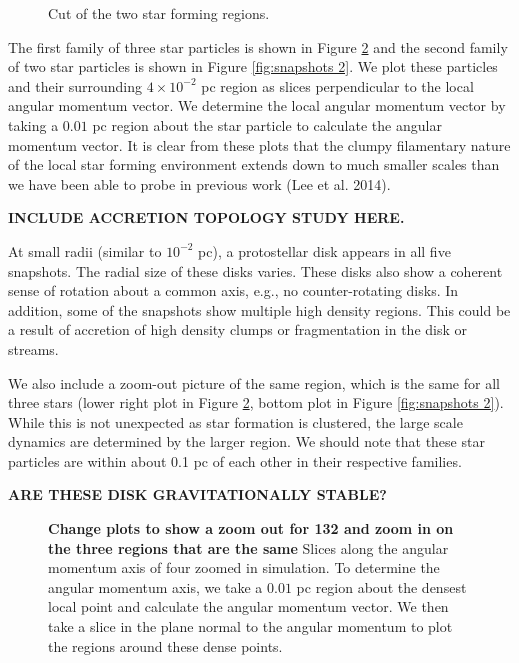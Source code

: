 \documentclass{emulateapj}
\begin{document}
\begin{figure}
\caption{Cut of the two star forming regions.\label{fig:star forming regions}}
\end{figure}

The first family of three star particles is shown in Figure \ref{fig:snapshots} and the second family of two star particles is shown in Figure \ref{fig:snapshots 2}.  We plot these particles and their surrounding $4\times 10^{-2}$ pc region as slices perpendicular to the local angular momentum vector.  We determine the local angular momentum vector by taking a $0.01$ pc region about the star particle to calculate the angular momentum vector.  It is clear from these plots that the clumpy filamentary nature of the local star forming environment extends down to much smaller scales than we have been able to probe in previous work (Lee et al. 2014).  

{\bf INCLUDE ACCRETION TOPOLOGY STUDY HERE.}

At small radii (similar to $10^{-2}$ pc), a protostellar disk appears in all five snapshots. The radial size of these disks varies. These disks also show a coherent sense of rotation about a common axis, e.g., no counter-rotating disks. In addition, some of the snapshots show multiple high density regions.  This could be a result of accretion of high density clumps or fragmentation in the disk or streams.  

We also include a zoom-out picture of the same region, which is the same for all three stars (lower right plot in Figure \ref{fig:snapshots}, bottom plot in Figure \ref{fig:snapshots 2}).  While this is not unexpected as star formation is clustered, the large scale dynamics are determined by the larger region.  We should note that these star particles are within about 0.1 pc of each other in their respective families.  

{\bf ARE THESE DISK GRAVITATIONALLY STABLE?}

\begin{figure}
\caption{{\bf Change plots to show a zoom out for 132 and zoom in on the three regions that are the same} Slices along the angular momentum axis of four zoomed in simulation. To determine the angular momentum axis, we take a $0.01$ pc region about the densest local point and calculate the angular momentum vector. We then take a slice in the plane normal to the angular momentum to plot the regions around these dense points. \label{fig:snapshots}}
\end{figure}
\end{document}
